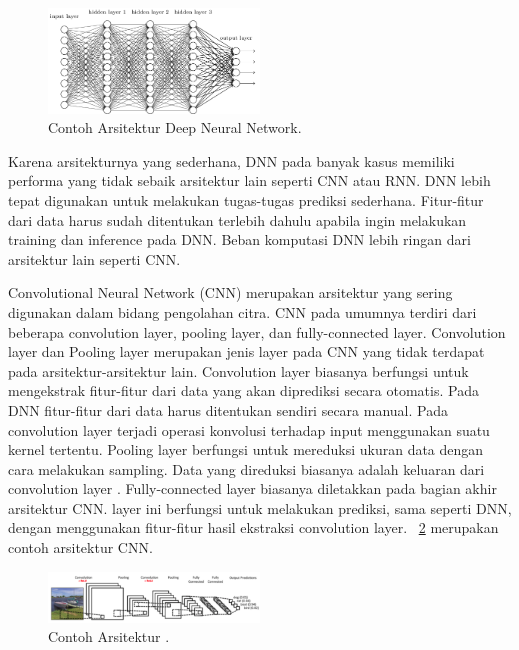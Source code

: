 \begin{figure}
	\centering
	\includegraphics[width=0.50\textwidth]
	{pics/dnn.png}
	\caption{Contoh Arsitektur Deep Neural Network.}
	\label{fig:dnn}
\end{figure}

Karena arsitekturnya yang sederhana, DNN pada banyak kasus memiliki performa yang tidak sebaik arsitektur lain seperti CNN atau RNN. DNN lebih tepat digunakan untuk melakukan tugas-tugas prediksi sederhana. Fitur-fitur dari data harus sudah ditentukan terlebih dahulu apabila ingin melakukan training dan inference pada DNN. Beban komputasi DNN lebih ringan dari arsitektur lain seperti CNN.

Convolutional Neural Network (CNN) merupakan arsitektur \deeplearning yang sering digunakan dalam bidang pengolahan citra. CNN pada umumnya terdiri dari beberapa convolution layer, pooling layer, dan fully-connected layer. Convolution layer dan Pooling layer merupakan jenis layer pada CNN yang tidak terdapat pada arsitektur-arsitektur lain. Convolution layer biasanya berfungsi untuk mengekstrak fitur-fitur dari data yang akan diprediksi secara otomatis. Pada DNN fitur-fitur dari data harus ditentukan sendiri secara manual. Pada convolution layer terjadi operasi konvolusi terhadap input menggunakan suatu kernel tertentu. Pooling layer berfungsi untuk mereduksi ukuran data dengan cara melakukan sampling. Data yang direduksi biasanya adalah keluaran dari convolution layer \cite{deeplearningmatrix}. Fully-connected layer biasanya diletakkan pada bagian akhir arsitektur CNN. layer ini berfungsi untuk melakukan prediksi, sama seperti DNN, dengan menggunakan fitur-fitur hasil ekstraksi convolution layer. \pic~\ref{fig:cnn} merupakan contoh arsitektur CNN.

\begin{figure}
	\centering
	\includegraphics[width=0.50\textwidth]
	{pics/cnn.png}
	\caption{Contoh Arsitektur \conv \nn.}
	\label{fig:cnn}
\end{figure}

